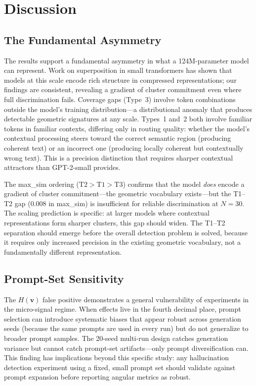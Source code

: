 \documentclass[11pt]{article}
\newcommand{\Hv}{H(\mathbf{v})}
\begin{document}
\section{Discussion}

\subsection{The Fundamental Asymmetry}

The results support a fundamental asymmetry in what a 124M-parameter model can represent. Work on superposition in small transformers \citep{elhage2022toy} has shown that models at this scale encode rich structure in compressed representations; our findings are consistent, revealing a gradient of cluster commitment even where full discrimination fails. Coverage gaps (Type~3) involve token combinations outside the model's training distribution---a distributional anomaly that produces detectable geometric signatures at any scale. Types~1 and~2 both involve familiar tokens in familiar contexts, differing only in routing quality: whether the model's contextual processing steers toward the correct semantic region (producing coherent text) or an incorrect one (producing locally coherent but contextually wrong text). This is a precision distinction that requires sharper contextual attractors than GPT-2-small provides.

The max\_sim ordering ($\text{T2} > \text{T1} > \text{T3}$) confirms that the model \textit{does} encode a gradient of cluster commitment---the geometric vocabulary exists---but the T1--T2 gap (0.008 in max\_sim) is insufficient for reliable discrimination at $N = 30$. The scaling prediction is specific: at larger models where contextual representations form sharper clusters, this gap should widen. The T1--T2 separation should emerge before the overall detection problem is solved, because it requires only increased precision in the existing geometric vocabulary, not a fundamentally different representation.

\subsection{Prompt-Set Sensitivity}

The $\Hv$ false positive demonstrates a general vulnerability of experiments in the micro-signal regime. When effects live in the fourth decimal place, prompt selection can introduce systematic biases that appear robust across generation seeds (because the same prompts are used in every run) but do not generalize to broader prompt samples. The 20-seed multi-run design catches generation variance but cannot catch prompt-set artifacts---only prompt diversification can. This finding has implications beyond this specific study: any hallucination detection experiment using a fixed, small prompt set should validate against prompt expansion before reporting angular metrics as robust.
\end{document}
